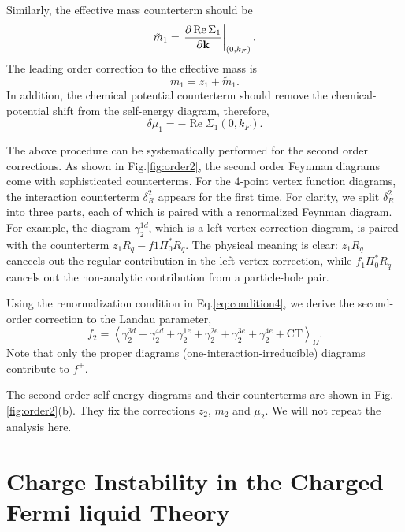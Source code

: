 \documentclass[reprint,amsmath,amssymb,aps,prb]{revtex4-1}
\begin{document}
Similarly, the effective mass counterterm should be
\begin{equation}
    \tilde{m}_1 = \left. \frac{\partial \operatorname{Re} \Sigma_1}{\partial \bold{k}} \right|_{(0, k_F)}.
\end{equation}
The leading order correction to the effective mass is
\begin{equation}
    m_1 = z_1+\tilde{m}_1.
\end{equation}
In addition, the chemical potential counterterm should remove the chemical-potential shift from the self-energy diagram, therefore,
\begin{equation}
    \delta \mu_1 = -\operatorname{Re} \Sigma_1(0, k_F).
\end{equation}

The above procedure can be systematically performed for the second order corrections.
As shown in Fig.\ref{fig:order2}, the second order Feynman diagrams come with sophisticated counterterms.
For the $4$-point vertex function diagrams, the interaction counterterm $\delta_R^2$ appears for the first time.
For clarity, we split $\delta_R^2$ into three parts, each of which is paired with a renormalized Feynman diagram.
For example, the diagram $\gamma_2^{1d}$, which is a left vertex correction diagram, is paired with the counterterm $z_1R_q-f1\Pi^*_0R_q$.
The physical meaning is clear: $z_1 R_q$ canecels out the regular contribution in the left vertex correction,
while $f_1\Pi_0^*R_q$ cancels out the non-analytic contribution from a particle-hole pair.

Using the renormalization condition in Eq.\eqref{eq:condition4}, we derive the second-order correction to the Landau parameter,
\begin{equation}
    f_2 = \left<\gamma_2^{3d}+\gamma_2^{4d}+\gamma_2^{1e}+\gamma_2^{2e}+\gamma_2^{3e}+\gamma_2^{4e} + \text{CT}\right>_\Omega.
\end{equation}
Note that only the proper diagrams (one-interaction-irreducible) diagrams contribute to $f^+$.

The second-order self-energy diagrams and their counterterms are shown in Fig.\ref{fig:order2}(b).
They fix the corrections $z_2$, $m_2$ and $\mu_2$. We will not repeat the analysis here.

\section{Charge Instability in the Charged Fermi liquid Theory}
\end{document}
